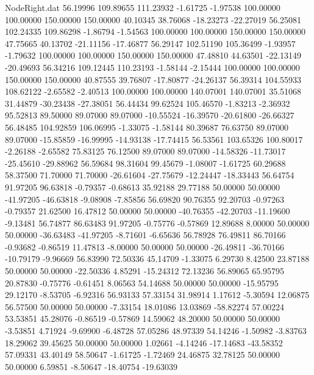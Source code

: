 \begin{filecontents}{NodeRight.dat}
  56.19996  109.89655  111.23932    -1.61725   -1.97538  100.00000  100.00000  150.00000  150.00000   40.10345   38.76068  -18.23273  -22.27019
  56.25081  102.24335  109.86298    -1.86794   -1.54563  100.00000  100.00000  150.00000  150.00000   47.75665   40.13702  -21.11156  -17.46877
  56.29147  102.51190  105.36499    -1.93957   -1.79632  100.00000  100.00000  150.00000  150.00000   47.48810   44.63501  -22.13149  -20.49693
  56.34216  109.12445  110.23193    -1.58144   -2.15444  100.00000  100.00000  150.00000  150.00000   40.87555   39.76807  -17.80877  -24.26137
  56.39314  104.55933  108.62122    -2.65582   -2.40513  100.00000  100.00000  140.07001  140.07001   35.51068   31.44879  -30.23438  -27.38051
  56.44434   99.62524  105.46570    -1.83213   -2.36932   95.52813   89.50000   89.07000   89.07000  -10.55524  -16.39570  -20.61800  -26.66327
  56.48485  104.92859  106.06995    -1.33075   -1.58144   80.39687   76.63750   89.07000   89.07000  -15.85859  -16.99995  -14.93138  -17.74415
  56.53561  103.65326  100.80017    -2.26188   -2.65582   75.83125   76.12500   89.07000   89.07000  -14.58326  -11.73017  -25.45610  -29.88962
  56.59684   98.31604   99.45679    -1.08007   -1.61725   60.29688   58.37500   71.70000   71.70000  -26.61604  -27.75679  -12.24447  -18.33443
  56.64754   91.97205   96.63818    -0.79357   -0.68613   35.92188   29.77188   50.00000   50.00000  -41.97205  -46.63818   -9.08908   -7.85856
  56.69820   90.76355   92.20703    -0.97263   -0.79357   21.62500   16.47812   50.00000   50.00000  -40.76355  -42.20703  -11.19600   -9.13481
  56.74877   86.63483   91.97205    -0.75776   -0.57869   12.89688    8.00000   50.00000   50.00000  -36.63483  -41.97205   -8.71601   -6.65636
  56.78928   76.49811   86.70166    -0.93682   -0.86519   11.47813   -8.00000   50.00000   50.00000  -26.49811  -36.70166  -10.79179   -9.96669
  56.83990   72.50336   45.14709    -1.33075    6.29730    8.42500   23.87188   50.00000   50.00000  -22.50336    4.85291  -15.24312   72.13236
  56.89065   65.95795   20.87830    -0.75776   -0.61451    8.06563   54.14688   50.00000   50.00000  -15.95795   29.12170   -8.53705   -6.92316
  56.93133   57.33154   31.98914     1.17612   -5.30594   12.06875   56.57500   50.00000   50.00000   -7.33154   18.01086   13.03869  -58.82274
  57.00224   53.53851   45.28076    -0.86519   -0.57869   14.59062   48.20000   50.00000   50.00000   -3.53851    4.71924   -9.69900   -6.48728
  57.05286   48.97339   54.14246    -1.50982   -3.83763   18.29062   39.45625   50.00000   50.00000    1.02661   -4.14246  -17.14683  -43.58352
  57.09331   43.40149   58.50647    -1.61725   -1.72469   24.46875   32.78125   50.00000   50.00000    6.59851   -8.50647  -18.40754  -19.63039

\end{filecontents}
